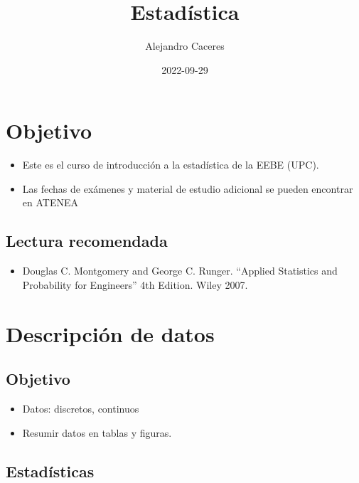 \documentclass[
]{book}
\title{Estadística}
\author{Alejandro Caceres}
\date{2022-09-29}
\providecommand{\tightlist}{%
  \setlength{\itemsep}{0pt}\setlength{\parskip}{0pt}}
\begin{document}
\maketitle

{
\setcounter{tocdepth}{1}
\tableofcontents
}
\hypertarget{objetivo}{%
\chapter{Objetivo}\label{objetivo}}

\begin{itemize}
\item
  Este es el curso de introducción a la estadística de la EEBE (UPC).
\item
  Las fechas de exámenes y material de estudio adicional se pueden encontrar en ATENEA
\end{itemize}

\hypertarget{lectura-recomendada}{%
\section{Lectura recomendada}\label{lectura-recomendada}}

\begin{itemize}
\tightlist
\item
  Douglas C. Montgomery and George C. Runger. ``Applied Statistics and Probability for Engineers'' 4th Edition. Wiley 2007.
\end{itemize}

\hypertarget{descripciuxf3n-de-datos}{%
\chapter{Descripción de datos}\label{descripciuxf3n-de-datos}}

\hypertarget{objetivo-1}{%
\section{Objetivo}\label{objetivo-1}}

\begin{itemize}
\tightlist
\item
  Datos: discretos, continuos
\item
  Resumir datos en tablas y figuras.
\end{itemize}

\hypertarget{estaduxedsticas}{%
\section{Estadísticas}\label{estaduxedsticas}}
\end{document}
